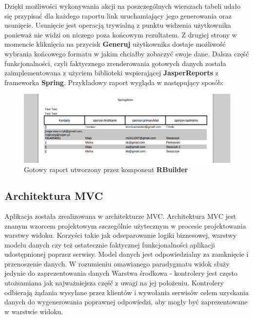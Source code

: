 		Dzięki możliwości wykonywania akcji na poszczególnych wierszach tabeli udało się przypisać dla każdego raportu link uruchamiający jego
		generowania oraz usunięcie. Usunięcie jest operacją trywialną z punktu widzenia użytkownika ponieważ nie widzi on niczego poza 
		końcowym rezultatem. Z drugiej strony w momencie kliknięcia na przycisk \textbf{Generuj} użytkownika dostaje możliwość
		wybrania końcowego formatu w jakim chciałby zobaczyć swoje dane. 
		Dalsza część funkcjonalności, czyli faktycznego zrenderowania gotowych danych została zaimplementowana z użyciem biblioteki wspierającej
		\textbf{JasperReports} z frameworka \textbf{Spring}. Przykładowy raport wygląda w następujący sposób:
		\begin{figure}[h]
			\centering
			\includegraphics[width=1.0\textwidth]{images/rbuilder_report}
			\caption[Gotowy raport utworzony przez komponent \textbf{RBuilder}]{
				Gotowy raport utworzony przez komponent \textbf{RBuilder}
			}
			\label{app:wizard_newReport_report}
		\end{figure}		
		
		
	\subsection{Architektura MVC} 
		Aplikacja została zrealizowana w architekturze MVC. Architektura MVC jest znanym wzorcem projektowym
		szczególnie użytecznym w procesie projektowania warstwy widoku. Korzyści takie jak odseparowanie logiki biznesowej,
		warstwy modelu danych czy też ostatecznie faktycznej funkcjonalności aplikacji udostępnionej poprzez serwisy. 
		Model danych jest odpowiedzialny za zamknięcie i przenoszenie danych. W rozumieniu omawianego paradygmatu widok służy
		jedynie do zaprezentowania danych Warstwa środkowa - kontrolery jest często utożsamiana jak najważniejsza część z uwagi
		na jej położeniu. Kontrolery odbierają żądania wysyłane przez klientów i wywołania serwisów celem uzyskania danych
		do wygenerowania poprawnej odpowiedzi, aby mogły być zaprezentowane w warstwie widoku\cite{spring_recipies}.
		

